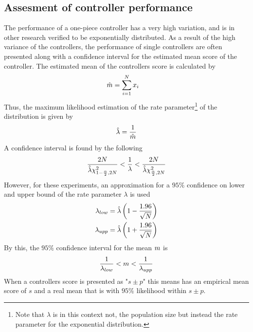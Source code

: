 \subsection{Assesment of controller performance}
The performance of a one-piece controller has a very high variation,
and is in other research verified to be exponentially distributed.
As a result of the high variance of the controllers, the performance 
of single controllers are often presented along with a confidence interval
for the estimated mean score of the controller. The estimated mean of 
the controllers score is calculated by
\begin{align*}
\hat{m} &= \sum_{i=1}^{N} x_i
\end{align*}
Thus, the maximum likelihood estimation of the rate 
parameter\footnote{Note that $\lambda$ is in this context not,
the population size but instead the rate parameter for the
exponential distribution.}
of the distribution is given by
\begin{align*}
\hat{\lambda} = \frac{1}{\hat{m}}
\end{align*}
A confidence interval is found by the following
\begin{align*}
\frac{2N}{\hat{\lambda}\chi^{2}_{1-\frac{\alpha}{2},2N}}
<
\frac{1}{\lambda}
< 
\frac{2N}{\hat{\lambda}\chi^{2}_{\frac{\alpha}{2},2N}}
\end{align*}
However, for these experiments, an approximation for a $95\%$
confidence on lower and upper bound 
of the rate parameter $\lambda$ is used
\begin{align*}
\lambda_{low} &= 
\hat{\lambda} \left( 1 - \frac{1.96}{\sqrt{N}} \right)\\
\lambda_{upp} &= 
\hat{\lambda} \left( 1 + \frac{1.96}{\sqrt{N}} \right)
\end{align*}
By this, the $95\%$ confidence interval for the mean $m$ is
\begin{align*}
\frac{1}{\lambda_{low}} < m < \frac{1}{\lambda_{upp}}
\end{align*}
When a controllers score is presented as "$s \pm p$" this means 
has an empirical mean score of $s$ and a real mean that is with 
$95\%$ likelihood within $s \pm p$. \\

